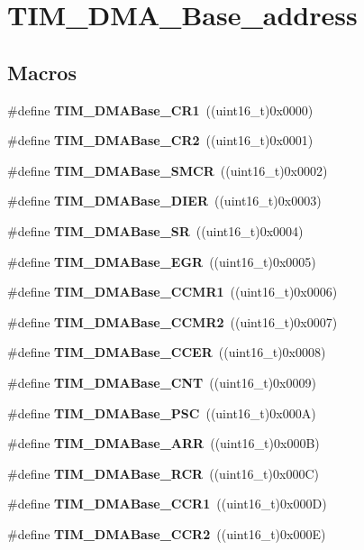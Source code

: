 \section{T\+I\+M\+\_\+\+D\+M\+A\+\_\+\+Base\+\_\+address}
\label{group__TIM__DMA__Base__address}
\subsection*{Macros}
\begin{DoxyCompactItemize}
\item 
\#define \textbf{ T\+I\+M\+\_\+\+D\+M\+A\+Base\+\_\+\+C\+R1}~((uint16\+\_\+t)0x0000)
\item 
\#define \textbf{ T\+I\+M\+\_\+\+D\+M\+A\+Base\+\_\+\+C\+R2}~((uint16\+\_\+t)0x0001)
\item 
\#define \textbf{ T\+I\+M\+\_\+\+D\+M\+A\+Base\+\_\+\+S\+M\+CR}~((uint16\+\_\+t)0x0002)
\item 
\#define \textbf{ T\+I\+M\+\_\+\+D\+M\+A\+Base\+\_\+\+D\+I\+ER}~((uint16\+\_\+t)0x0003)
\item 
\#define \textbf{ T\+I\+M\+\_\+\+D\+M\+A\+Base\+\_\+\+SR}~((uint16\+\_\+t)0x0004)
\item 
\#define \textbf{ T\+I\+M\+\_\+\+D\+M\+A\+Base\+\_\+\+E\+GR}~((uint16\+\_\+t)0x0005)
\item 
\#define \textbf{ T\+I\+M\+\_\+\+D\+M\+A\+Base\+\_\+\+C\+C\+M\+R1}~((uint16\+\_\+t)0x0006)
\item 
\#define \textbf{ T\+I\+M\+\_\+\+D\+M\+A\+Base\+\_\+\+C\+C\+M\+R2}~((uint16\+\_\+t)0x0007)
\item 
\#define \textbf{ T\+I\+M\+\_\+\+D\+M\+A\+Base\+\_\+\+C\+C\+ER}~((uint16\+\_\+t)0x0008)
\item 
\#define \textbf{ T\+I\+M\+\_\+\+D\+M\+A\+Base\+\_\+\+C\+NT}~((uint16\+\_\+t)0x0009)
\item 
\#define \textbf{ T\+I\+M\+\_\+\+D\+M\+A\+Base\+\_\+\+P\+SC}~((uint16\+\_\+t)0x000\+A)
\item 
\#define \textbf{ T\+I\+M\+\_\+\+D\+M\+A\+Base\+\_\+\+A\+RR}~((uint16\+\_\+t)0x000\+B)
\item 
\#define \textbf{ T\+I\+M\+\_\+\+D\+M\+A\+Base\+\_\+\+R\+CR}~((uint16\+\_\+t)0x000\+C)
\item 
\#define \textbf{ T\+I\+M\+\_\+\+D\+M\+A\+Base\+\_\+\+C\+C\+R1}~((uint16\+\_\+t)0x000\+D)
\item 
\#define \textbf{ T\+I\+M\+\_\+\+D\+M\+A\+Base\+\_\+\+C\+C\+R2}~((uint16\+\_\+t)0x000\+E)

\end{DoxyCompactItemize}
